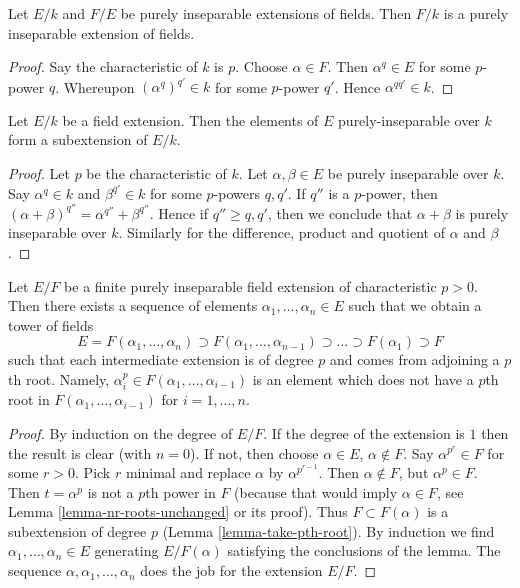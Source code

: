 \begin{lemma}
\label{lemma-purely-inseparable-permanence}
Let $E/k$ and $F/E$ be purely inseparable extensions of fields. Then $F/k$
is a purely inseparable extension of fields.
\end{lemma}

\begin{proof}
Say the characteristic of $k$ is $p$. Choose $\alpha \in F$. Then
$\alpha^q \in E$ for some $p$-power $q$. Whereupon $(\alpha^q)^{q'} \in k$
for some $p$-power $q'$. Hence $\alpha^{qq'} \in k$.
\end{proof}

\begin{lemma}
\label{lemma-purely-inseparable-elements}
Let $E/k$ be a field extension. Then the elements of $E$ purely-inseparable
over $k$ form a subextension of $E/k$.
\end{lemma}

\begin{proof}
Let $p$ be the characteristic of $k$.
Let $\alpha, \beta \in E$ be purely inseparable over $k$. Say
$\alpha^q \in k$ and $\beta^{q'} \in k$ for some $p$-powers $q, q'$.
If $q''$ is a $p$-power, then
$(\alpha + \beta)^{q''} = \alpha^{q''} + \beta^{q''}$.
Hence if $q'' \geq q, q'$, then we conclude that $\alpha + \beta$
is purely inseparable over $k$. Similarly for the difference,
product and quotient of $\alpha$ and $\beta$.
\end{proof}

\begin{lemma}
\label{lemma-finite-purely-inseparable}
Let $E/F$ be a finite purely inseparable field extension of
characteristic $p > 0$. Then there exists a sequence of elements
$\alpha_1, \ldots, \alpha_n \in E$ such that we obtain a tower
of fields
$$
E = F(\alpha_1, \ldots, \alpha_n) \supset
F(\alpha_1, \ldots, \alpha_{n - 1}) \supset
\ldots
\supset F(\alpha_1) \supset F
$$
such that each intermediate extension is of degree $p$ and comes
from adjoining a $p$th root. Namely,
$\alpha_i^p \in F(\alpha_1, \ldots, \alpha_{i - 1})$
is an element which does not have a $p$th root in
$F(\alpha_1, \ldots, \alpha_{i - 1})$ for $i = 1, \ldots, n$.
\end{lemma}

\begin{proof}
By induction on the degree of $E/F$. If the degree of the extension is $1$
then the result is clear (with $n = 0$). If not, then choose
$\alpha \in E$, $\alpha \not \in F$. Say $\alpha^{p^r} \in F$ for some
$r > 0$. Pick $r$ minimal and replace $\alpha$ by $\alpha^{p^{r - 1}}$.
Then $\alpha \not \in F$, but $\alpha^p \in F$. Then $t = \alpha^p$ is not
a $p$th power in $F$ (because that would imply $\alpha \in F$, see
Lemma \ref{lemma-nr-roots-unchanged} or its proof).
Thus $F \subset F(\alpha)$ is a subextension of degree $p$
(Lemma \ref{lemma-take-pth-root}). By induction we find
$\alpha_1, \ldots, \alpha_n \in E$ generating $E/F(\alpha)$
satisfying the conclusions of the lemma.
The sequence $\alpha, \alpha_1, \ldots, \alpha_n$ does the job
for the extension $E/F$.
\end{proof}

